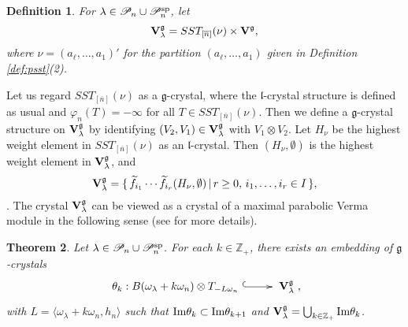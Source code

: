 \documentclass[leqno,11pt]{amsart}
\newtheorem{thm}{\bf Theorem}[section]
\newtheorem{df}[thm]{\bf Definition}
\numberwithin{equation}{section}
\newcommand{\cP}{\mathscr{P}}
\newcommand{\ov}{\overline}
\newcommand{\Z}{\mathbb{Z}}
\newcommand{\tf}{\widetilde{f}}
\newcommand{\g}{\mathfrak{g}}
\newcommand{\mf}{\mathfrak}
\newcommand{\la}{\lambda}
\begin{document}
\begin{df}\label{def:parabolic Verma}{\rm
For $\lambda\in \cP_n\cup \cP_n^{\rm sp}$, let
\begin{equation*}
{\bf V}^{\mf g}_{\lambda}= SST_{[\ov{n}]}(\nu)\times {\bf V}^{\g},
\end{equation*}
where $\nu=(a_\ell,\ldots,a_1)'$ for the partition $(a_\ell,\ldots,a_1)$ given in Definition \ref{def:psst}(2).
}
\end{df}\vskip 2mm

Let us regard $SST_{[\ov{n}]}(\nu)$ as a $\g$-crystal, where the $\mf l$-crystal structure is defined as usual and $\varphi_n(T)=-\infty$ for all $T\in SST_{[\ov{n}]}(\nu)$.  
Then we define a $\g$-crystal structure on  ${\bf V}^\g_\la$  by identifying $(V_2,V_1)\in {\bf V}^\g_\la$ with $V_1\otimes V_2$.  
Let $H_\nu$ be the highest weight element in $SST_{[\ov{n}]}(\nu)$ as an $\mf l$-crystal. Then $(H_\nu,\emptyset)$ is the highest weight element in ${\bf V}^\g_\la$, and 
\begin{equation*}
{\bf V}^\g_\la=\{\,\tf_{i_1}\cdots\tf_{i_r}(H_\nu,\emptyset)\,|\,r\geq 0,\, i_1,\ldots,i_r\in I\,\},
\end{equation*}
\cite[Proposition 3.5]{K12}. The crystal ${\bf V}^\g_\la$ can be viewed as a crystal of a maximal parabolic Verma module in the following sense (see \cite[Section 3.2]{K12} for more details).

\begin{thm}
Let $\la\in\cP_n \cup \cP_n^{\rm sp}$. 
For each $k\in\Z_+$, there exists an embedding of $\g$-crystals 
\begin{equation*}
\xymatrixcolsep{2pc}\xymatrixrowsep{0pc}\xymatrix{
\theta_k : B(\omega_\la + k\omega_n)\otimes T_{-L\omega_n}\ \ar@{^{(}->}[r]  & \ {\bf V}^{\g}_{\la}}, 
\end{equation*}
with $L=\langle \omega_\la + k\omega_n, h_n\rangle$ such that ${\rm Im}\theta_k\subset {\rm Im}\theta_{k+1}$ and ${\bf V}^{\g}_{\la}=\bigcup_{k\in\Z_+}{\rm Im}\theta_k$.
\end{thm} 
\end{document}
